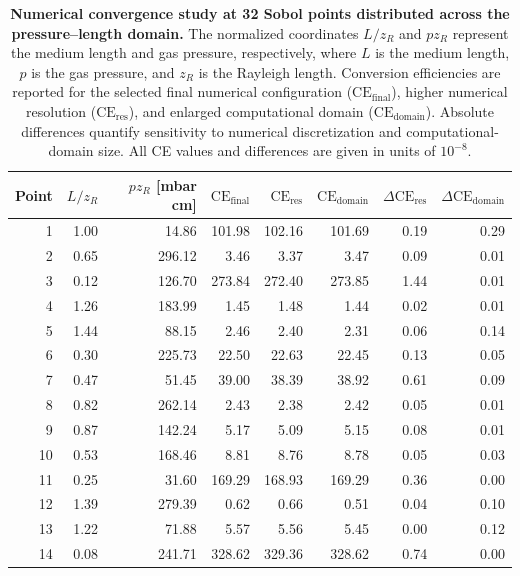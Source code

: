 \documentclass[11pt,a4paper]{article}
\newcommand{\CE}{\ensuremath{\mathrm{CE}}}
\begin{document}
\begin{table}[p]
\centering
\caption{\textbf{Numerical convergence study at 32 Sobol points distributed across the pressure--length domain.} The normalized coordinates $L/z_R$ and $pz_R$ represent the medium length and gas pressure, respectively, where $L$ is the medium length, $p$ is the gas pressure, and $z_R$ is the Rayleigh length. Conversion efficiencies are reported for the selected final numerical configuration ($\CE_{\mathrm{final}}$), higher numerical resolution ($\CE_{\mathrm{res}}$), and enlarged computational domain ($\CE_{\mathrm{domain}}$). Absolute differences quantify sensitivity to numerical discretization and computational-domain size. All CE values and differences are given in units of $10^{-8}$.}
\label{tab:numerical_convergence}
\vspace{0.8em}
\normalsize
\renewcommand{\arraystretch}{1.00}
\setlength{\tabcolsep}{6pt}
\begin{tabular}{r r r r r r r r}
\toprule
Point & $L/z_R$ & $pz_R$ [mbar cm] & $\CE_{\mathrm{final}}$ & $\CE_{\mathrm{res}}$ & $\CE_{\mathrm{domain}}$ & $\Delta\CE_{\mathrm{res}}$ & $\Delta\CE_{\mathrm{domain}}$ \\
\midrule
1 & 1.00 & 14.86 & 101.98 & 102.16 & 101.69 & 0.19 & 0.29 \\
2 & 0.65 & 296.12 & 3.46 & 3.37 & 3.47 & 0.09 & 0.01 \\
3 & 0.12 & 126.70 & 273.84 & 272.40 & 273.85 & 1.44 & 0.01 \\
4 & 1.26 & 183.99 & 1.45 & 1.48 & 1.44 & 0.02 & 0.01 \\
5 & 1.44 & 88.15 & 2.46 & 2.40 & 2.31 & 0.06 & 0.14 \\
6 & 0.30 & 225.73 & 22.50 & 22.63 & 22.45 & 0.13 & 0.05 \\
7 & 0.47 & 51.45 & 39.00 & 38.39 & 38.92 & 0.61 & 0.09 \\
8 & 0.82 & 262.14 & 2.43 & 2.38 & 2.42 & 0.05 & 0.01 \\
9 & 0.87 & 142.24 & 5.17 & 5.09 & 5.15 & 0.08 & 0.01 \\
10 & 0.53 & 168.46 & 8.81 & 8.76 & 8.78 & 0.05 & 0.03 \\
11 & 0.25 & 31.60 & 169.29 & 168.93 & 169.29 & 0.36 & 0.00 \\
12 & 1.39 & 279.39 & 0.62 & 0.66 & 0.51 & 0.04 & 0.10 \\
13 & 1.22 & 71.88 & 5.57 & 5.56 & 5.45 & 0.00 & 0.12 \\
14 & 0.08 & 241.71 & 328.62 & 329.36 & 328.62 & 0.74 & 0.00 \\

\end{tabular}
\end{table}
\end{document}
